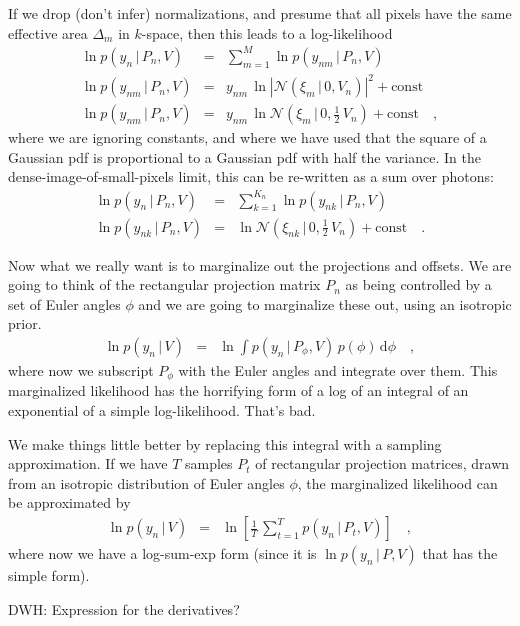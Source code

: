 \documentclass[12pt]{article}
\newcommand{\normal}{\mathscr{N}}
\newcommand{\sqnorm}[1]{|{#1}|^2}
\newcommand{\given}{\,|\,}
\newcommand{\dd}{\mathrm{d}}
\begin{document}
If we drop (don't infer) normalizations, and presume that all pixels
have the same effective area $\Delta_m$ in $k$-space, then this leads
to a log-likelihood
\begin{eqnarray}
  \ln p(y_n\given P_n,V) &=& \sum_{m=1}^M \ln p(y_{nm}\given P_n,V)
  \\
  \ln p(y_{nm}\given P_n,V) &=& y_{nm}\,\ln\sqnorm{\normal(\xi_m\given 0,V_n)} + \mbox{const}
  \\
  \ln p(y_{nm}\given P_n,V) &=& y_{nm}\,\ln\normal(\xi_m\given 0,\frac{1}{2}\,V_n) + \mbox{const}
  \quad,
\end{eqnarray}
where we are ignoring constants, and where we have used that the square
of a Gaussian pdf is proportional to a Gaussian pdf with half the variance.
In the dense-image-of-small-pixels limit, this can be re-written as a
sum over photons:
\begin{eqnarray}
  \ln p(y_n\given P_n,V) &=& \sum_{k=1}^{K_n} \ln p(y_{nk}\given P_n,V)
  \\
  \ln p(y_{nk}\given P_n,V) &=& \ln\normal(\xi_{nk}\given 0,\frac{1}{2}\,V_n) + \mbox{const}
  \quad.
\end{eqnarray}

Now what we really want is to marginalize out the projections and
offsets.
We are going to think of the rectangular projection matrix $P_n$ as
being controlled by a set of Euler angles $\phi$ and we are going to
marginalize these out, using an isotropic prior.
\begin{eqnarray}
  \ln p(y_n\given V) &=& \ln\int p(y_n\given P_{\phi},V)\,p(\phi)\,\dd\phi
  \quad,
\end{eqnarray}
where now we subscript $P_{\phi}$ with the Euler angles and integrate
over them.
This marginalized likelihood has the horrifying form of a log of an
integral of an exponential of a simple log-likelihood.  That's bad.

We make things little better by replacing this integral with a
sampling approximation.
If we have $T$ samples $P_t$ of rectangular projection matrices, drawn
from an isotropic distribution of Euler angles $\phi$, the
marginalized likelihood can be approximated by
\begin{eqnarray}
  \ln p(y_n\given V) &=& \ln\left[\frac{1}{T}\,\sum_{t=1}^T p(y_n\given P_t,V)\right]
  \quad,
\end{eqnarray}
where now we have a log-sum-exp form (since it is $\ln p(y_n\given
P,V)$ that has the simple form).

DWH: Expression for the derivatives?
\end{document}
